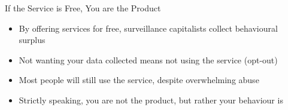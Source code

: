 \documentclass[aspectratio=169]{beamer}
\begin{document}
    {%
    \begin{frame}{If the Service is Free, You are the Product}
        \begin{itemize}
            \item By offering services for free, surveillance capitalists
                collect behavioural surplus
            \item Not wanting your data collected means not using the service
                (opt-out)
            \item Most people will still use the service, despite overwhelming
                abuse
            \pause{}
            \item Strictly speaking, you are not the product, but rather your
                behaviour is
        \end{itemize}
    \end{frame}
    }
\end{document}
